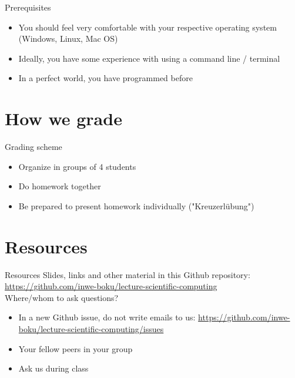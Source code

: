 \documentclass[10pt,color=usenames,dvipsnames]{beamer}
\begin{document}
\begin{frame}{Prerequisites}
	\begin{itemize}
        \item You should feel very comfortable with your respective operating system (Windows, Linux, Mac OS)
		\item Ideally, you have some experience with using a command line / terminal
		\item In a perfect world, you have programmed before
	\end{itemize}
\end{frame}


\section{How we grade}

\begin{frame}{Grading scheme}

	\begin{itemize}
		\item Organize in groups of 4 students
		\item Do homework together
		\item Be prepared to present homework individually ("Kreuzerlübung")
	\end{itemize}

\end{frame}

\section{Resources}

\begin{frame}[fragile]{Resources}
    Slides, links and other material in this Github repository:
    \href{https://github.com/inwe-boku/lecture-scientific-computing}{https://github.com/inwe-boku/lecture-scientific-computing}\\
    \bigskip
    \pause
    Where/whom to ask questions?
	\begin{itemize}
        \item In a new Github issue, do not write emails to us:
            \href{https://github.com/inwe-boku/lecture-scientific-computing/issues}{https://github.com/inwe-boku/lecture-scientific-computing/issues}
		\item Your fellow peers in your group
		\item Ask us during class
	\end{itemize}
\end{frame}
\end{document}
